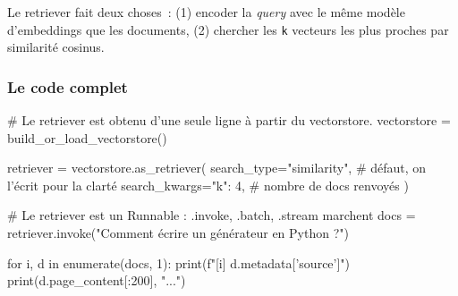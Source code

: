 \documentclass[11pt,a4paper]{article}
\begin{document}
\begin{center}
\end{center}

Le retriever fait deux choses~: (1) encoder la \emph{query} avec le même
modèle d'embeddings que les documents, (2) chercher les \texttt{k}
vecteurs les plus proches par similarité cosinus.

\subsubsection{Le code complet}

\begin{pythoncode}
# Le retriever est obtenu d'une seule ligne à partir du vectorstore.
vectorstore = build_or_load_vectorstore()

retriever = vectorstore.as_retriever(
    search_type="similarity",        # défaut, on l'écrit pour la clarté
    search_kwargs={"k": 4},          # nombre de docs renvoyés
)

# Le retriever est un Runnable : .invoke, .batch, .stream marchent
docs = retriever.invoke("Comment écrire un générateur en Python ?")

for i, d in enumerate(docs, 1):
    print(f"[{i}] {d.metadata['source']}")
    print(d.page_content[:200], "...")
\end{pythoncode}
\end{document}
